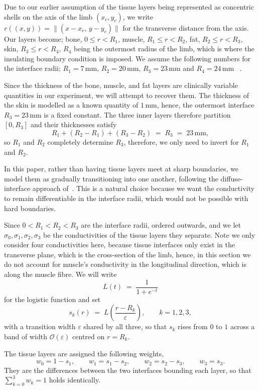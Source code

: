 \documentclass[final-report]{report-template}
\begin{document}
Due to our earlier assumption of the tissue layers being represented as concentric shells on the axis of the limb $(x_c, y_c)$, we write $r((x, y)) = \lVert (x - x_c,\, y - y_c) \rVert$ for the transverse distance from the axis. Our layers become; bone, $0 \le r < R_1$, muscle, $R_1 \le r < R_2$, fat, $R_2 \le r < R_3$, skin, $R_3 \le r < R_4$, $R_4$ being the outermost radius of the limb, which is where the insulating boundary condition is imposed. We assume the following numbers for the interface radii; $R_1=7\,\mathrm{mm}$, $R_2=20\,\mathrm{mm}$, $R_3=23\,\mathrm{mm}$ and $R_4=24\,\mathrm{mm}$ ~\cite{maksymenko2023}.

Since the thickness of the bone, muscle, and fat layers are clinically variable quantities in our experiment, we will attempt to recover them. The thickness of the skin is modelled as a known quantity of $1\,\mathrm{mm}$, hence, the outermost interface $R_3 = 23\,\mathrm{mm}$ is a fixed constant. The three inner layers therefore partition $[0, R_3]$ and their thicknesses satisfy
$$
R_1 + (R_2 - R_1) + (R_3 - R_2) \;=\; R_3 \;=\; 23\,\mathrm{mm},
$$
so $R_1$ and $R_2$ completely determine $R_3$, therefore,  we only need to invert for $R_1$ and $R_2$.


In this paper, rather than having tissue layers meet at sharp boundaries, we model them as
gradually transitioning into one another, following the diffuse-interface
approach of~\cite{li2009}. This is a natural choice because we want the conductivity to remain differentiable in the interface radii, which would not be possible with hard boundaries.

Since $0 < R_1 < R_2 < R_3$ are the interface radii, ordered outwards, and we let $\sigma_0, \sigma_1, \sigma_2, \sigma_3$ be the conductivities of the tissue layers they separate. Note we only consider four conductivities here, because tissue interfaces only exist in the transverse plane, which is the cross-section of the limb, hence, in this section we do not account for muscle's conductivity in the longitudinal direction, which is along the muscle fibre. We will write
$$
L(t) \;=\; \frac{1}{1 + e^{-t}}
$$
for the logistic function and set
$$
s_k(r) \;=\; L\!\left(\frac{r - R_k}{\varepsilon}\right),
\qquad k = 1, 2, 3 ,
$$
with a transition width $\varepsilon$ shared by all three, so that $s_k$ rises from $0$ to $1$ across a band of width $\mathcal O(\varepsilon)$ centred on $r = R_k$.

The tissue layers are assigned the following weights,
$$
w_0 = 1 - s_1, \qquad
w_1 = s_1 - s_2, \qquad
w_2 = s_2 - s_3, \qquad
w_3 = s_3.
$$
They are the differences between the two interfaces bounding each layer, so that $\sum_{k=0}^{3} w_k = 1$ holds identically. 
\end{document}
